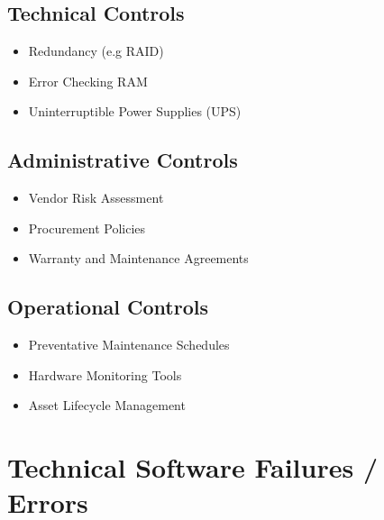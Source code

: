 \documentclass[12pt letter]{report}
\begin{document}
\subsection{Technical Controls}

\begin{itemize}
  \item Redundancy (e.g RAID)
  \item Error Checking RAM
  \item Uninterruptible Power Supplies (UPS)
\end{itemize}

\subsection{Administrative Controls}

\begin{itemize}
  \item Vendor Risk Assessment
  \item Procurement Policies
  \item Warranty and Maintenance Agreements
\end{itemize}

\subsection{Operational Controls}

\begin{itemize}
  \item Preventative Maintenance Schedules
  \item Hardware Monitoring Tools
  \item Asset Lifecycle Management
\end{itemize}

\section{Technical Software Failures / Errors}
\end{document}
